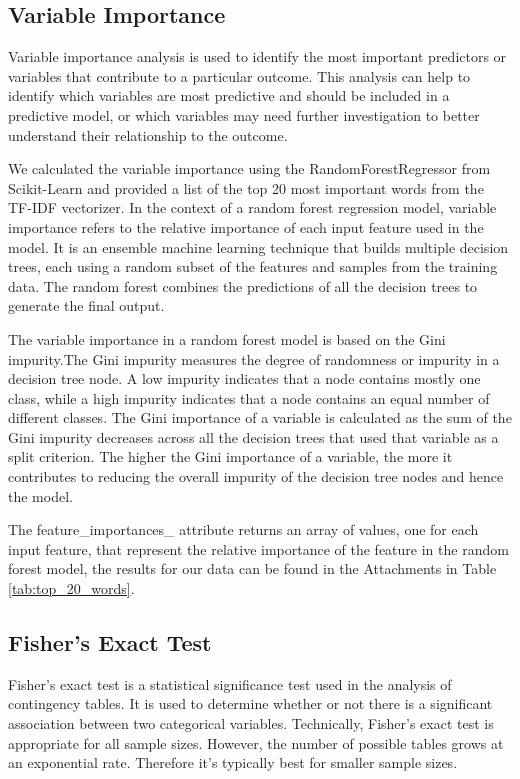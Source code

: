 \subsection{Variable Importance}

Variable importance analysis is used to identify the most important predictors or variables that contribute to a particular outcome. This analysis can help to identify which variables are most predictive and should be included in a predictive model, or which variables may need further investigation to better understand their relationship to the outcome.

We calculated the variable importance using the RandomForestRegressor from Scikit-Learn and provided a list of the top 20 most important words from the TF-IDF vectorizer. In the context of a random forest regression model, variable importance refers to the relative importance of each input feature used in the model. It is an ensemble machine learning technique that builds multiple decision trees, each using a random subset of the features and samples from the training data. The random forest combines the predictions of all the decision trees to generate the final output. 

The variable importance in a random forest model is based on the Gini impurity.The Gini impurity measures the degree of randomness or impurity in a decision tree node. A low impurity indicates that a node contains mostly one class, while a high impurity indicates that a node contains an equal number of different classes. The Gini importance of a variable is calculated as the sum of the Gini impurity decreases across all the decision trees that used that variable as a split criterion. The higher the Gini importance of a variable, the more it contributes to reducing the overall impurity of the decision tree nodes and hence the model. 

The feature\_importances\_ attribute returns an array of values, one for each input feature, that represent the relative importance of the feature in the random forest model, the results for our data can be found in the Attachments in Table \ref{tab:top_20_words}.

\subsection{Fisher's Exact Test}

Fisher's exact test is a statistical significance test used in the analysis of contingency tables. It is used to determine whether or not there is a significant association between two categorical variables. Technically, Fisher's exact test is appropriate for all sample sizes. However, the number of possible tables grows at an exponential rate. Therefore it's typically best for smaller sample sizes.

